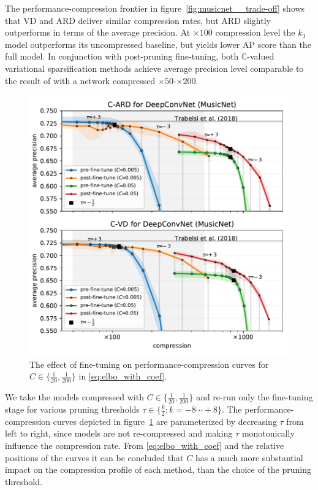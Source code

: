 \documentclass[a4paper,10pt,twocolumn]{article}
\newcommand{\cplx}{\mathbb{C}}
\begin{document}
The performance-compression frontier in figure~\ref{fig:musicnet__trade-off} shows that
VD and ARD deliver similar compression rates, but ARD slightly outperforms in terms of
the average precision. At $\times100$ compression level the $k_3$ model outperforms its
uncompressed baseline, but yields lower AP score than the full model. In conjunction with
post-pruning fine-tuning, both $\cplx$-valued variational sparsification methods achieve
average precision level comparable to the result of \citet{trabelsi_deep_2018} with a
network compressed $\times50$-$\times200$.

\begin{figure}[!t]
  \centering
  \includegraphics[width=1\columnwidth]{figure__musicnet__threshold__C__DeepConvNet.pdf}
  \caption{%
    The effect of fine-tuning on performance-compression curves for $
      C\in \{\tfrac1{20}, \frac1{200}\}
    $ in \eqref{eq:elbo_with_coef}.
  }
  \label{fig:hist__and__threshold__tradeoff}
\end{figure}

We take the models compressed with $C \in \{\tfrac1{20}, \frac1{200}\}$ and re-run only
the fine-tuning stage for various pruning thresholds $
  \tau \in \{\tfrac{k}2\colon k=-8\cdots+8\}
$. The performance-compression curves depicted in figure~\ref{fig:hist__and__threshold__tradeoff}
are parameterized by decreasing $\tau$ from left to right, since models are not re-compressed
and making $\tau$ monotonically influence the compression rate. From \eqref{eq:elbo_with_coef}
and the relative positions of the curves it can be concluded that $C$ has a much more
substantial impact on the compression profile of each method, than the choice of the
pruning threshold.
\end{document}

